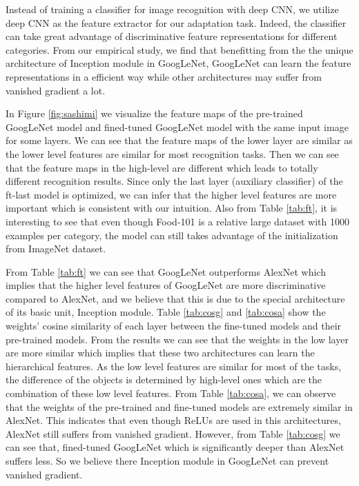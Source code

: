 Instead of training a classifier for image recognition with deep CNN, we utilize deep CNN as the feature extractor for our adaptation task. Indeed, the classifier can take great advantage of discriminative feature representations for different categories. From our empirical study, we find that benefitting from the the unique architecture of Inception module in GoogLeNet, GoogLeNet can learn the feature representations in a efficient way while other architectures may suffer from vanished gradient a lot.

In Figure \ref{fig:sashimi} we visualize the feature maps of the pre-trained GoogLeNet model and fined-tuned GoogLeNet model with the same input image for some layers. We can see that the feature maps of the lower layer are similar as the lower level features are similar for most recognition tasks.
Then we can see that the feature maps in the high-level are different which leads to totally different recognition results.
Since only the last layer (auxiliary classifier) of the ft-last model is optimized, we can infer that the higher level features are more important which is consistent with our intuition. Also from Table \ref{tab:ft}, it is interesting to see that even though Food-101 is a relative large dataset with 1000 examples per category, the model can still takes advantage of the initialization from ImageNet dataset.

From Table \ref{tab:ft} we can see that GoogLeNet outperforms AlexNet which implies that the higher level features of GoogLeNet are more discriminative compared to AlexNet, and we believe that this is due to the special architecture of its basic unit, Inception module. Table \ref{tab:cosg} and \ref{tab:cosa} show the weights' cosine similarity of each layer between the fine-tuned models and their pre-trained models. From the results we can see that the weights in the low layer are more similar which implies that these two architectures can learn the hierarchical features. As the low level features are similar for most of the tasks, the difference of the objects is determined by high-level ones which are the combination of these low level features. From Table \ref{tab:cosa}, we can observe that the weights of the pre-trained and fine-tuned models are extremely similar in AlexNet. This indicates that even though ReLUs are used in this architectures, AlexNet still suffers from vanished gradient. However, from Table \ref{tab:cosg} we can see that, fined-tuned GoogLeNet which is significantly deeper than AlexNet suffers less. So we believe there Inception module in GoogLeNet can prevent vanished gradient.


